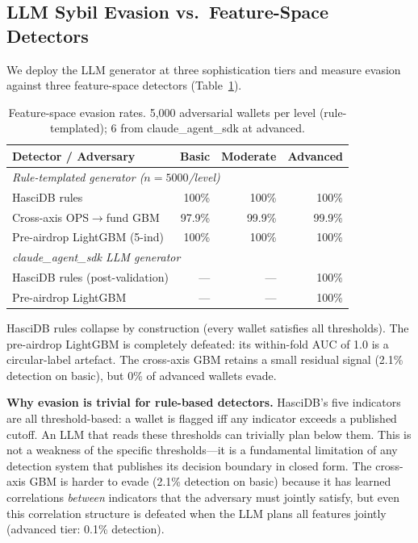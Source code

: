 \documentclass[sigconf,nonacm=false]{acmart}
\begin{document}
\subsection{LLM Sybil Evasion vs.\ Feature-Space Detectors}
\label{sec:evasion}

We deploy the LLM generator at three sophistication tiers and measure evasion against three feature-space detectors (Table~\ref{tab:evasion}).

\begin{table}[t]
\caption{Feature-space evasion rates. 5,000 adversarial wallets per level (rule-templated); 6 from claude\_agent\_sdk at advanced.}
\label{tab:evasion}
\small
\begin{tabular}{lrrr}
\toprule
Detector / Adversary & Basic & Moderate & Advanced \\
\midrule
\multicolumn{4}{l}{\textit{Rule-templated generator ($n{=}5000$/level)}} \\
HasciDB rules                 & 100\% & 100\% & 100\% \\
Cross-axis OPS$\to$fund GBM  & 97.9\% & 99.9\% & 99.9\% \\
Pre-airdrop LightGBM (5-ind) & 100\% & 100\% & 100\% \\
\midrule
\multicolumn{4}{l}{\textit{claude\_agent\_sdk LLM generator}} \\
HasciDB rules (post-validation) & --- & --- & 100\% \\
Pre-airdrop LightGBM            & --- & --- & 100\% \\
\bottomrule
\end{tabular}
\end{table}

HasciDB rules collapse by construction (every wallet satisfies all thresholds). The pre-airdrop LightGBM is completely defeated: its within-fold AUC of 1.0 is a circular-label artefact. The cross-axis GBM retains a small residual signal (2.1\% detection on basic), but \evasionLightgbmMl{}0\% of advanced wallets evade.

\noindent\textbf{Why evasion is trivial for rule-based detectors.}
HasciDB's five indicators are all threshold-based: a wallet is flagged iff any indicator exceeds a published cutoff.
An LLM that reads these thresholds can trivially plan below them.
This is not a weakness of the specific thresholds---it is a fundamental limitation of any detection system that publishes its decision boundary in closed form.
The cross-axis GBM is harder to evade (2.1\% detection on basic) because it has learned correlations \textit{between} indicators that the adversary must jointly satisfy, but even this correlation structure is defeated when the LLM plans all features jointly (advanced tier: 0.1\% detection).
\end{document}

